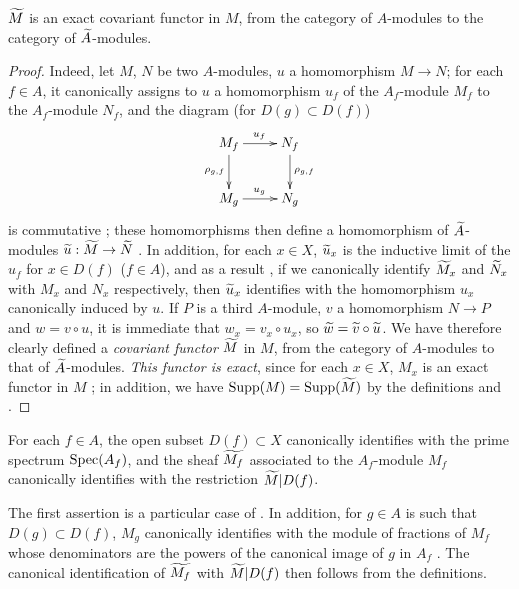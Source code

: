 \begin{prop}[1.3.5]
\label{1.1.3.5}
$\widetilde{M}$ is an exact covariant functor in $M$, from the category of $A$-modules to the
category of $\widetilde{A}$-modules.
\end{prop}

\begin{proof}
\label{proof-1.1.3.5}
Indeed, let $M$, $N$ be two $A$-modules, $u$ a homomorphism $M\to N$; for each $f\in A$,
it canonically assigns to $u$ a homomorphism $u_f$ of the $A_f$-module $M_f$ to the
$A_f$-module $N_f$, and the diagram (for $D(g)\subset D(f)$)
\[
  \xymatrix{
    M_f\ar[r]^{u_f}\ar[d]_{\rho_{g,f}} & N_f\ar[d]^{\rho_{g,f}}\\
    M_g\ar[r]^{u_g} & N_g
  }
\]
is commutative ; these homomorphisms then define a homomorphism of
$\widetilde{A}$-modules $\widetilde{u}:\widetilde{M}\to\widetilde{N}$ . In
addition, for each $x\in X$, $\widetilde{u}_x$ is the inductive limit of the $u_f$ for
$x\in D(f)$ ($f\in A$), and as a result , if we canonically identify
$\widetilde{M}_x$ and $\widetilde{N}_x$ with $M_x$ and $N_x$ respectively, then $\widetilde{u}_x$
identifies with the homomorphism $u_x$ canonically induced by $u$. If $P$ is a third
$A$-module, $v$ a homomorphism $N\to P$ and $w=v\circ u$, it is immediate that
$w_x=v_x\circ u_x$, so $\widetilde{w}=\widetilde{v}\circ\widetilde{u}$. We have therefore
clearly defined a \emph{covariant functor} $\widetilde{M}$ in $M$, from the category of
$A$-modules to that of $\widetilde{A}$-modules. \emph{This functor is exact}, since for each
$x\in X$, $M_x$ is an exact functor in $M$ ; in addition, we have
${\mathop{\mathrm{Supp}}\nolimits}(M)={\mathop{\mathrm{Supp}}\nolimits}(\widetilde{M})$ by the definitions  and
.
\end{proof}

\begin{prop}[1.3.6]
\label{1.1.3.6}
For each $f\in A$, the open subset $D(f)\subset X$ canonically identifies with the prime
spectrum ${\mathop{\mathrm{Spec}}\nolimits}(A_f)$, and the sheaf $\widetilde{M_f}$ associated to the $A_f$-module
$M_f$ canonically identifies with the restriction $\widetilde{M}|D(f)$.
\end{prop}

The first assertion is a particular case of . In addition, for $g\in A$ is
such that $D(g)\subset D(f)$, $M_g$ canonically identifies with the module of fractions of
$M_f$ whose denominators are the powers of the canonical image of $g$ in $A_f$
. The canonical identification of $\widetilde{M_f}$ with
$\widetilde{M}|D(f)$ then follows from the definitions.

